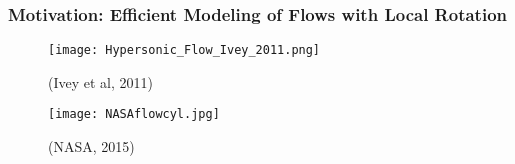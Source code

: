 \documentclass{beamer}
\begin{document}



\begin{frame}
 \frametitle{Motivation: Efficient Modeling of Flows with Local Rotation}
 \begin{multicols}{2}
  \begin{figure}
   \texttt{[image: Hypersonic\_Flow\_Ivey\_2011.png]}
  \caption{\tiny (Ivey et al, 2011)}
  \end{figure}
  \begin{figure}
   \texttt{[image: NASAflowcyl.jpg]}
   \caption{\tiny (NASA, 2015)}
  \end{figure}
 \end{multicols}
\end{frame}
\end{document}
